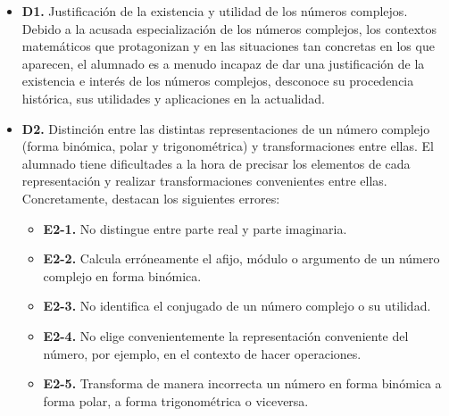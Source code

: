\documentclass[../main.tex]{memoir}
\begin{document}
\begin{itemize}
	\item \textbf{D1.} Justificación de la existencia y utilidad de los números complejos. \\
		Debido a la acusada especialización de los números complejos, los contextos matemáticos que protagonizan y en las situaciones tan concretas en los que aparecen, el alumnado es a menudo incapaz de dar una justificación de la existencia e interés de los números complejos, desconoce su procedencia histórica, sus utilidades y aplicaciones en la actualidad.
		
	\item \textbf{D2.} Distinción entre las distintas representaciones de un número complejo (forma binómica, polar y trigonométrica) y transformaciones entre ellas.
	El alumnado tiene dificultades a la hora de precisar los elementos de cada representación y realizar transformaciones convenientes entre ellas. Concretamente, destacan los siguientes errores:
	\begin{itemize}
		\item \textbf{E2-1.} No distingue entre parte real y parte imaginaria.
		\item \textbf{E2-2.} Calcula erróneamente el afijo, módulo o argumento de un número complejo en forma binómica.
		\item \textbf{E2-3.} No identifica el conjugado de un número complejo o su utilidad.
		\item \textbf{E2-4.} No elige convenientemente la representación conveniente del número, por ejemplo, en el contexto de hacer operaciones.
		\item \textbf{E2-5.} Transforma de manera incorrecta un número en forma binómica a forma polar, a  forma trigonométrica o viceversa.
	\end{itemize}
	

\end{itemize}
\end{document}
